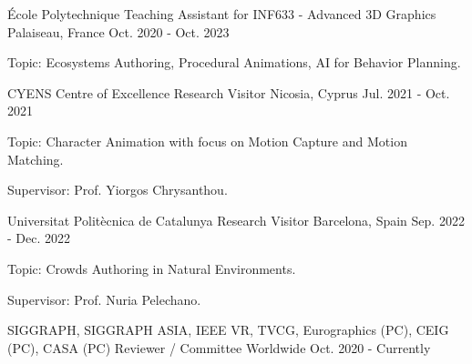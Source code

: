 

\begin{cventries}

\cventry
  {École Polytechnique} %
  {Teaching Assistant for INF633 - Advanced 3D Graphics} %
  {Palaiseau, France} %
  {Oct. 2020 - Oct. 2023} %
  {
    \begin{cvitems} %
      \item {Topic: Ecosystems Authoring, Procedural Animations, AI for Behavior Planning.}
    \end{cvitems}
  }

  \cventry
    {CYENS Centre of Excellence} %
    {Research Visitor} %
    {Nicosia, Cyprus} %
    {Jul. 2021 - Oct. 2021} %
    {
      \begin{cvitems} %
        \item {Topic: Character Animation with focus on Motion Capture and Motion Matching.}
        \item {Supervisor: Prof. Yiorgos Chrysanthou.}
      \end{cvitems}
    }

\cventry
    {Universitat Politècnica de Catalunya} %
    {Research Visitor} %
    {Barcelona, Spain} %
    {Sep. 2022 - Dec. 2022} %
    {
      \begin{cvitems} %
        \item {Topic: Crowds Authoring in Natural Environments.}
        \item {Supervisor: Prof. Nuria Pelechano.}
      \end{cvitems}
    }

\cventry
  {SIGGRAPH, SIGGRAPH ASIA, IEEE VR, TVCG, Eurographics (PC), CEIG (PC), CASA (PC)} %
  {Reviewer / Committee} %
  {Worldwide} %
  {Oct. 2020 - Currently} %
  {}

\end{cventries}
